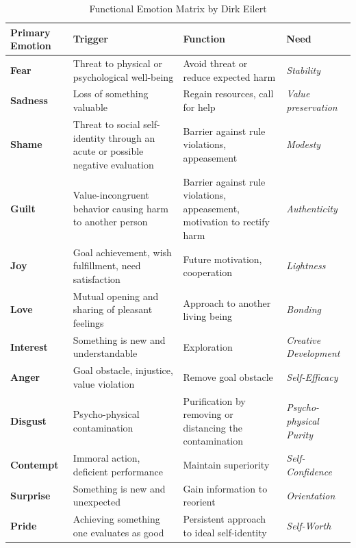 \begin{table}[H]
\renewcommand{\arraystretch}{1.5}
\centering
\begin{tabular}{L{3cm}|L{4.5cm}|L{4.6cm}|L{3.5cm}}
\textbf{Primary Emotion} & \textbf{Trigger} & \textbf{Function} & \textbf{Need}\\
\hline

\textbf{Fear} & Threat to physical or psychological well-being & Avoid threat or reduce expected harm & \textit{Stability} \\
\textbf{Sadness} & Loss of something valuable & Regain resources, call for help & \textit{Value preservation} \\
\textbf{Shame} & Threat to social self-identity through an acute or possible negative evaluation & Barrier against rule violations, appeasement & \textit{Modesty} \\
\textbf{Guilt} & Value-incongruent behavior causing harm to another person & Barrier against rule violations, appeasement, motivation to rectify harm & \textit{Authenticity} \\
\textbf{Joy} & Goal achievement, wish fulfillment, need satisfaction & Future motivation, cooperation & \textit{Lightness} \\
\textbf{Love} & Mutual opening and sharing of pleasant feelings & Approach to another living being & \textit{Bonding} \\
\textbf{Interest} & Something is new and understandable & Exploration & \textit{Creative Development} \\
\textbf{Anger} & Goal obstacle, injustice, value violation & Remove goal obstacle & \textit{Self-Efficacy} \\
\textbf{Disgust} & Psycho-physical contamination & Purification by removing or distancing the contamination & \textit{Psycho-physical Purity} \\
\textbf{Contempt} & Immoral action, deficient performance & Maintain superiority & \textit{Self-Confidence} \\
\textbf{Surprise} & Something is new and unexpected & Gain information to reorient & \textit{Orientation} \\
\textbf{Pride} & Achieving something one evaluates as good & Persistent approach to ideal self-identity & \textit{Self-Worth} \\
\end{tabular}
\caption{Functional Emotion Matrix by Dirk Eilert}
\label{tab:emotionsmatrix}
\end{table}

